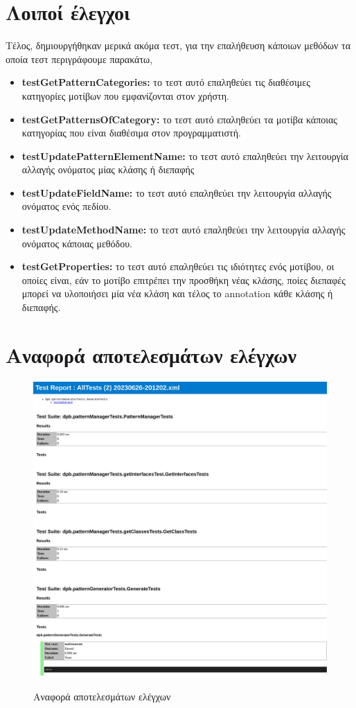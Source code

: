 \section{Λοιποί έλεγχοι}
\label{sec:moreTests}
Τέλος, δημιουργήθηκαν μερικά ακόμα τεστ, για την επαλήθευση κάποιων μεθόδων τα οποία τεστ περιγράφουμε παρακάτω,
\begin{itemize}
    \item \textbf{testGetPatternCategories:} το τεστ αυτό επαληθεύει τις διαθέσιμες κατηγορίες μοτίβων που εμφανίζονται στον χρήστη.
    \item \textbf{testGetPatternsOfCategory:} το τεστ αυτό επαληθεύει τα μοτίβα κάποιας κατηγορίας που είναι διαθέσιμα 
    στον προγραμματιστή.
    \item \textbf{testUpdatePatternElementName:} το τεστ αυτό επαληθεύει την λειτουργία αλλαγής ονόματος μίας κλάσης ή διεπαφής
    \item \textbf{testUpdateFieldName:} το τεστ αυτό επαληθεύει την λειτουργία αλλαγής ονόματος ενός πεδίου.
    \item \textbf{testUpdateMethodName:} το τεστ αυτό επαληθεύει την λειτουργία αλλαγής ονόματος κάποιας μεθόδου.
    \item \textbf{testGetProperties:} το τεστ αυτό επαληθεύει τις ιδιότητες ενός μοτίβου, οι οποίες είναι, 
    εάν το μοτίβο επιτρέπει την προσθήκη νέας κλάσης, 
    ποίες διεπαφές μπορεί να υλοποιήσει μία νέα κλάση και τέλος το annotation κάθε κλάσης ή διεπαφής.
\end{itemize}
\section{Αναφορά αποτελεσμάτων ελέγχων}
\label{sec:testReport}
\begin{figure}[H]
    \includegraphics[width=1.0\textwidth]{Figures/test_report.png}
    \label{fig:testReport}
    \caption{Αναφορά αποτελεσμάτων ελέγχων}
\end{figure}
